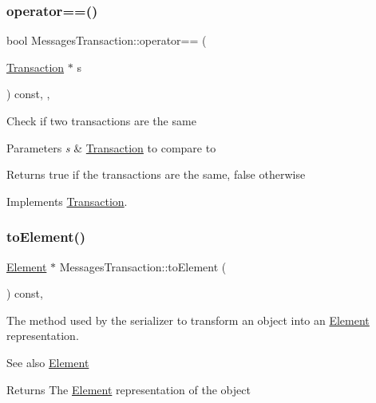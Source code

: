 \subsubsection{\texorpdfstring{operator==()}{operator==()}}
{\footnotesize\ttfamily bool Messages\+Transaction\+::operator== (\begin{DoxyParamCaption}\item[{\mbox{\hyperlink{classTransaction}{Transaction}} $\ast$}]{s }\end{DoxyParamCaption}) const\hspace{0.3cm}{\ttfamily [inline]}, {\ttfamily [override]}, {\ttfamily [virtual]}}

Check if two transactions are the same


\begin{DoxyParams}{Parameters}
{\em s} & \mbox{\hyperlink{classTransaction}{Transaction}} to compare to \\
\hline
\end{DoxyParams}
\begin{DoxyReturn}{Returns}
true if the transactions are the same, false otherwise 
\end{DoxyReturn}


Implements \mbox{\hyperlink{classTransaction_a9a17c97fdcda6791484ad6d07b34470e}{Transaction}}.

\mbox{\label{classMessagesTransaction_a0ef8ec080a2698a02ad8b1b95d243720}} 
\subsubsection{\texorpdfstring{to\+Element()}{toElement()}}
{\footnotesize\ttfamily \mbox{\hyperlink{classElement}{Element}} $\ast$ Messages\+Transaction\+::to\+Element (\begin{DoxyParamCaption}{ }\end{DoxyParamCaption}) const\hspace{0.3cm}{\ttfamily [override]}, {\ttfamily [virtual]}}

The method used by the serializer to transform an object into an \mbox{\hyperlink{classElement}{Element}} representation. \begin{DoxySeeAlso}{See also}
\mbox{\hyperlink{classElement}{Element}}
\end{DoxySeeAlso}
\begin{DoxyReturn}{Returns}
The \mbox{\hyperlink{classElement}{Element}} representation of the object 
\end{DoxyReturn}


